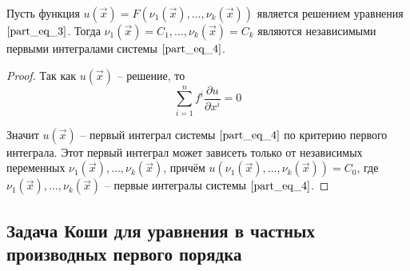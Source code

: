 \documentclass[a4paper, 12pt]{article}
\begin{document}
    \begin{theorem}
        Пусть функция $u(\overrightarrow{x}) = F(\nu_1(\overrightarrow{x}), \dots, \nu_k(\overrightarrow{x}))$ является решением уравнения $\ref{part_eq_3}$. Тогда $\nu_1(\overrightarrow{x}) = C_1, \dots, \nu_k(\overrightarrow{x}) = C_k$ являются независимыми первыми интегралами системы $\ref{part_eq_4}$. 
    \end{theorem}
    \begin{proof}
        Так как $u(\overrightarrow{x})$ -- решение, то 
        \begin{equation*}
            \sum \limits_{i = 1}^{n} f^i \frac{\partial u}{\partial x^i} = 0
        \end{equation*}

        Значит $u(\overrightarrow{x})$ -- первый интеграл системы $\ref{part_eq_4}$ по критерию первого интеграла. Этот первый интеграл может зависеть только от независимых переменных $\nu_1(\overrightarrow{x}), \dots, \nu_k(\overrightarrow{x})$, причём $u(\nu_1(\overrightarrow{x}), \dots, \nu_k(\overrightarrow{x})) = C_0$, где $\nu_1(\overrightarrow{x}), \dots, \nu_k(\overrightarrow{x})$ -- первые интегралы системы $\ref{part_eq_4}$.
    \end{proof}

    \subsection{Задача Коши для уравнения в частных производных первого порядка}
\end{document}
